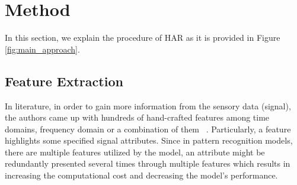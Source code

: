 \documentclass[journal,article,submit,moreauthors,pdftex]{Definitions/mdpi}
\newcommand{\diego}[1]{\textcolor{gray}{{\it [Diego: #1]}}}
\begin{document}


\section{Method}
In this section, we explain the procedure of HAR as it is provided in Figure \ref{fig:main_approach}.

\subsection{Feature Extraction}
\label{sec:feature_extraction}



In literature, in order to gain more information from the sensory data (signal), the authors came up with hundreds of hand-crafted features among time domains, frequency domain or a combination of them ~\cite{wang2019survey}. Particularly, a feature highlights some specified signal attributes. Since in pattern recognition models, there are multiple features utilized by the model, an attribute might be redundantly presented several times through multiple features which results in increasing the computational cost and decreasing the model's performance.
\end{document}
